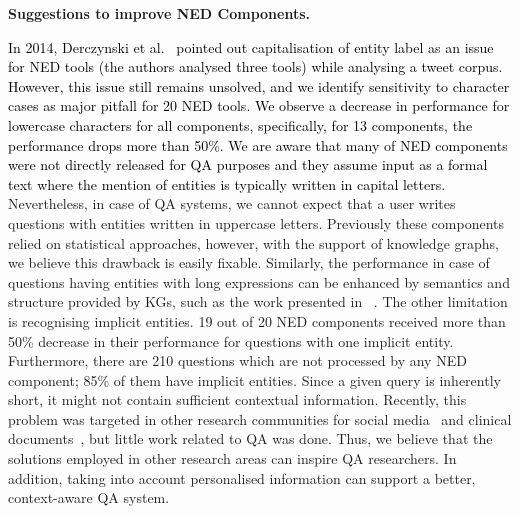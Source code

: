 \documentclass[sigconf,edbt]{acmart-edbt2019}
\begin{document}
{\bf Suggestions to improve NED Components.} \begin{inparaenum}[\itshape i\upshape)] 
\textcolor{black}{In 2014, Derczynski et al.~\cite{DBLP:journals/ipm/DerczynskiM0EGTPB15} pointed out capitalisation of entity label as an issue for NED tools (the authors analysed three tools) while analysing a tweet corpus. However, this issue still remains unsolved, and we identify sensitivity to character cases as major pitfall for 20 NED tools. We observe a decrease in performance for lowercase characters for all components, specifically, for 13 components, the performance drops more than 50\%. We are aware that many of NED components were not directly released for QA purposes and they assume input as a formal text where the mention of entities is typically written in capital letters.}
Nevertheless, in case of QA systems, we cannot expect that a user writes questions with entities written in uppercase letters.
Previously these components relied on statistical approaches, however, with the support of knowledge graphs, we believe this drawback is easily fixable.
Similarly, the performance in case of questions having entities with long expressions can be enhanced by semantics and structure provided by KGs, such as the work presented in ~\cite{DBLP:conf/cikm/ReinandaMR16}.
The other limitation is recognising implicit entities. 19 out of 20 NED components received more than 50\% decrease in their performance for questions with one implicit entity. Furthermore, there are 210 questions which are not processed by any NED component; 85\% of them have implicit entities.
Since a given query is inherently short, it might not contain sufficient contextual information.
Recently, this problem was targeted in other research communities for social media~\cite{DBLP:conf/esws/PereraMAST16} and clinical documents~\cite{DBLP:conf/starsem/PereraMSTAHM15}, but little work related to QA was done.
Thus, we believe that the solutions employed in other research areas can inspire QA researchers. In addition, taking into account personalised information can support a better, context-aware QA system.

\end{inparaenum}
\end{document}
